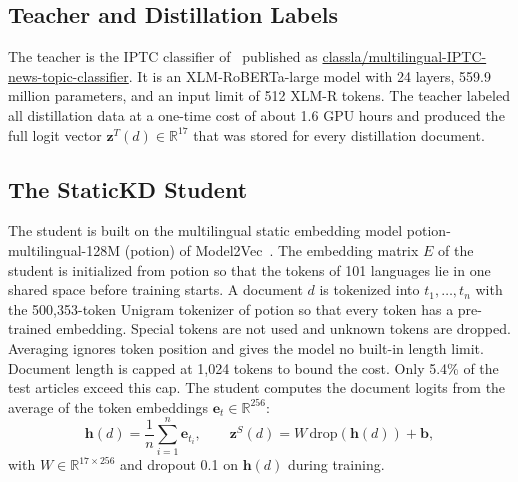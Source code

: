 \documentclass{ieeeaccess}
\begin{document}
\subsection{Teacher and Distillation Labels}
\label{sec:teacher}
The teacher is the IPTC classifier of~\cite{kuzman2025llm} published as \url{classla/multilingual-IPTC-news-topic-classifier}. It is an XLM-RoBERTa-large model with 24 layers, 559.9 million parameters, and an input limit of 512 XLM-R tokens. The teacher labeled all distillation data at a one-time cost of about 1.6 GPU hours and produced the full logit vector $\mathbf{z}^{T}(d)\in\mathbb{R}^{17}$ that was stored for every distillation document.

\subsection{The StaticKD Student}
\label{sec:student}
The student is built on the multilingual static embedding model potion-multilingual-128M (potion) of Model2Vec~\cite{tulkens2024model2vec}. The embedding matrix $E$ of the student is initialized from potion so that the tokens of 101 languages lie in one shared space before training starts. A document $d$ is tokenized into $t_1,\dots,t_n$ with the 500,353-token Unigram tokenizer of potion so that every token has a pre-trained embedding. Special tokens are not used and unknown tokens are dropped. Averaging ignores token position and gives the model no built-in length limit. Document length is capped at 1,024 tokens to bound the cost. Only 5.4\% of the test articles exceed this cap. The student computes the document logits from the average of the token embeddings $\mathbf{e}_t\in\mathbb{R}^{256}$:
\begin{equation}
\mathbf{h}(d)=\frac{1}{n}\sum_{i=1}^{n}\mathbf{e}_{t_i},\qquad
\mathbf{z}^{S}(d)=W\,\mathrm{drop}(\mathbf{h}(d))+\mathbf{b},
\label{eq:student}
\end{equation}
with $W\in\mathbb{R}^{17\times 256}$ and dropout 0.1 on $\mathbf{h}(d)$ during training.
\end{document}
